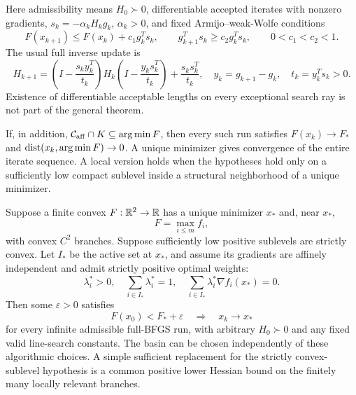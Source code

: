 Here admissibility means $H_0\succ0$, differentiable accepted iterates with nonzero gradients, $s_k=-\alpha_kH_kg_k$, $\alpha_k>0$, and fixed Armijo--weak-Wolfe conditions
\begin{equation}\label{C:eq:AW}
 F(x_{k+1})\le F(x_k)+c_1g_k^Ts_k,\qquad
 g_{k+1}^Ts_k\ge c_2g_k^Ts_k,\qquad 0<c_1<c_2<1.
\end{equation}
The usual full inverse update is
\begin{equation}\label{C:eq:bfgs}
 H_{k+1}=\left(I-\frac{s_ky_k^T}{t_k}\right)H_k
 \left(I-\frac{y_ks_k^T}{t_k}\right)+\frac{s_ks_k^T}{t_k},\quad
 y_k=g_{k+1}-g_k,\quad t_k=y_k^Ts_k>0.
\end{equation}
Existence of differentiable acceptable lengths on every exceptional search ray is not part of the general theorem.

\begin{corollary}\label{C:cor:AC}
If, in addition, $\mathcal C_{\rm aff}\cap K\subseteq\arg\min F$, then every such run satisfies $F(x_k)\to F_*$ and $\operatorname{dist}(x_k,\arg\min F)\to0$. A unique minimizer gives convergence of the entire iterate sequence. A local version holds when the hypotheses hold only on a sufficiently low compact sublevel inside a structural neighborhood of a unique minimizer.
\end{corollary}

\begin{corollary}\label{C:cor:max}
Suppose a finite convex $F:\mathbb R^2\to\mathbb R$ has a unique minimizer $x_*$ and, near $x_*$,
\[
 F=\max_{i\le m}f_i,
\]
with convex $C^2$ branches. Suppose sufficiently low positive sublevels are strictly convex. Let $I_*$ be the active set at $x_*$, and assume its gradients are affinely independent and admit strictly positive optimal weights:
\begin{equation}\label{C:eq:nondeg}
 \lambda_i^*>0,\quad \sum_{i\in I_*}\lambda_i^*=1,\quad
 \sum_{i\in I_*}\lambda_i^*\nabla f_i(x_*)=0.
\end{equation}
Then some $\varepsilon>0$ satisfies
\[
 F(x_0)<F_*+\varepsilon\quad\Longrightarrow\quad x_k\to x_*
\]
for every infinite admissible full-BFGS run, with arbitrary $H_0\succ0$ and any fixed valid line-search constants. The basin can be chosen independently of these algorithmic choices. A simple sufficient replacement for the strictly convex-sublevel hypothesis is a common positive lower Hessian bound on the finitely many locally relevant branches.
\end{corollary}

